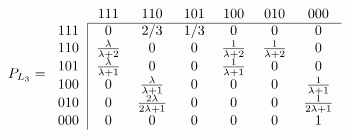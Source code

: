 \documentclass{article}
\theoremstyle{plain}
\theoremstyle{definition}
\theoremstyle{remark}
\numberwithin{equation}{section}
\begin{document}
\begin{equation}
P_{L_3} = 
\begin{blockarray}{ccccccc}
    & 111 & 110 & 101 & 100 & 010 & 000\\
    \begin{block}{c|cccccc}
    \cline{2-7}
    111 & 0 &2/3 & 1/3 & 0 & 0 & 0\\
    110 & \frac{\lambda}{\lambda + 2} & 0 & 0 & \frac{1}{\lambda + 2} & \frac{1}{\lambda + 2} & 0\\
    101 & \frac{\lambda}{\lambda + 1} & 0 & 0 & \frac{1}{\lambda + 1} & 0 & 0\\
    100 & 0 & \frac{\lambda}{\lambda + 1} & 0 & 0 & 0 & \frac{1}{\lambda + 1}\\
    010 & 0 & \frac{2\lambda}{2\lambda + 1} & 0 & 0 & 0 & \frac{1}{2\lambda + 1}\\
    000 & 0 & 0 & 0 & 0 & 0 & 1\\
    \end{block}
\end{blockarray}
\end{equation}




\end{document}
